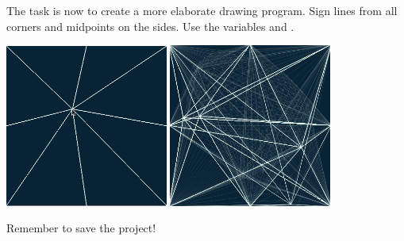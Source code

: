 \begin{exercisebox}[adjusted title=New Project:Creative Programming ]
The task is now to create a more elaborate drawing program. Sign
lines from all corners and midpoints on the sides. Use
the variables  and .
\begin{center}
 \includegraphics[width=0.40\textwidth]{illustrationer/kryds.png}
 \quad
 \includegraphics[width=0.40\textwidth]{illustrationer/kryds-tegning.png}
\end{center}
Remember to save the project!
\end{exercisebox}
